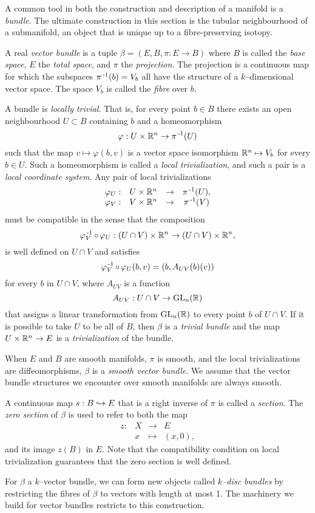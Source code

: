 A common tool in both the construction and description of a manifold is a \emph{bundle}.
The ultimate construction in this section is the tubular neighbourhood of a submanifold, an object that is unique up to a fibre-preserving isotopy.

\begin{defn}[Bundle]
	A real \emph{vector bundle} is a tuple $\beta = (E,B,\pi:E\to B)$ where $B$ is called the \emph{base space}, $E$ the \emph{total space}, and $\pi$ the \emph{projection}.
	The projection is a continuous map for which the subspaces $\pi^{\,\text{-}1}(b)=V_b$ all have the structure of a $k$--dimensional vector space.
	The space $V_b$ is called the \emph{fibre} over $b$.
	
	A bundle is \emph{locally trivial}.
	That is, for every point $b\in B$ there exists an open neighbourhood $U\subset B$ containing $b$ and a homeomorphism
	\[
		\varphi: U\times \mathbb{R}^n\to \pi^{\,\text{-}1}(U)
	\]
	such that the map $v\mapsto\varphi(b,v)$ is a vector space isomorphism $\mathbb{R}^n\mapsto V_b$ for every $b\in U$.
	Such a homeomorphism is called a \emph{local trivialization}, and such a pair is a \emph{local coordinate system}.
	Any pair of local trivializations
	\[
		\begin{array}{cccc}
			\varphi_U: & U\times\mathbb{R}^n & \to & \pi^{\,\text{-}1}(U), \\
			\varphi_V: & V\times\mathbb{R}^n & \to & \pi^{\,\text{-}1}(V)
		\end{array}
	\]
	must be compatible in the sense that the composition 
	\[
		\varphi_V\inv\comp\varphi_U : (U\cap V)\times\RRN\to (U\cap V)\times\RRN,
	\]
	is well defined on $U\cap V$ and satisfies
	\[
		\varphi_V\inv\comp\varphi_U(b,v) = (b, A_{UV}(b)(v))
	\]
	for every $b$ in $U\cap V$, where $A_{UV}$ is a function
	\[
		A_{UV}: U\cap V\to \textrm{GL}_{n}(\mathbb{R})
	\]
	that assigns a linear transformation from $\textrm{GL}_{n}(\mathbb{R})$ to every point $b$ of $U\cap V$.
	If it is possible to take $U$ to be all of $B$, then $\beta$ is a \emph{trivial bundle} and the map $U\times\mathbb{R}^n\to E$ is a \emph{trivialization} of the bundle.
	
	When $E$ and $B$ are smooth manifolds, $\pi$ is smooth, and the local trivializations are diffeomorphisms, $\beta$ is a \emph{smooth vector bundle}.
	We assume that the vector bundle structures we encounter over smooth manifolds are always smooth.
	
	A continuous map $s:B\hookrightarrow E$ that is a right inverse of $\pi$ is called a \emph{section}.
	The \emph{zero section} of $\beta$ is used to refer to both the map
	\[
		\begin{array}{cccc}
			z: & X & \to 	 & E \\
			   & x & \mapsto & (x,0),
		\end{array}
	\]
	and its image $z(B)$ in $E$.
	Note that the compatibility condition on local trivialization guarantees that the zero section is well defined.
	
	For $\beta$ a $k$--vector bundle, we can form new objects called \emph{$k$--disc bundles} by restricting the fibres of $\beta$ to vectors with length at most 1.
	The machinery we build for vector bundles restricts to this construction.
\end{defn}

